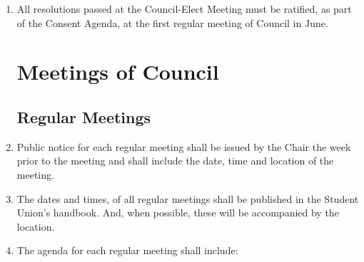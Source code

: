 \documentclass[oneside]{book}
\begin{document}
\begin{enumerate}
\item All resolutions passed at the Council-Elect Meeting must be ratified, 
as part of the Consent Agenda, at the first regular meeting of Council in June.

\chapter{\label{Meetings_of_Council}Meetings of Council }
\section{\label{Regular_Meetings}Regular Meetings }
\item Public notice for each regular meeting shall be issued by the Chair
the week prior to the meeting and shall include the date, time and
location of the meeting. 
\item The dates and times, of all regular meetings shall be published in
the Student Union's handbook. And, when possible, these will be accompanied by the location.
\item The agenda for each regular meeting shall include: 


\end{enumerate}
\end{document}
